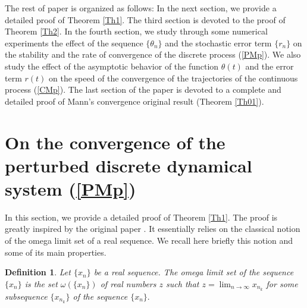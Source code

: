 \documentclass[11pt]{amsart}%
\theoremstyle{plain}
\numberwithin{equation}{section}
\newtheorem{definition}{Definition}[section]
\begin{document}
 The rest of paper is organized as follows: In the next section, we provide a detailed proof of Theorem \ref{Th1}. The third section is devoted to the proof of Theorem \ref{Th2}. In the fourth section, we study through  some numerical experiments  the effect of the sequence $\{\theta_n\}$ and the stochastic error term $\{r_n\}$ on the stability and the rate of convergence of the discrete process (\ref{PMp}). We also study the effect of the asymptotic behavior of the function $\theta(t)$ and the error term $r(t)$ on the speed of the convergence of the trajectories of the continuous process (\ref{CMp}). The last section of the paper is devoted to a complete and detailed proof of Mann's convergence original result (Theorem \ref{Th01}).

\section{On the convergence of the perturbed discrete dynamical system (\ref{PMp})}
In this section, we provide a detailed proof of Theorem \ref{Th1}. The proof is greatly inspired by the original  paper \cite{FM}. It essentially relies on the
classical notion of the omega limit set of a real sequence. We recall here
briefly this notion and some of its main properties.

\begin{definition}
Let $\{x_{n}\}$ be a real sequence. The omega limit set of the sequence $%
\{x_{n}\}$ is the set $\omega (\{x_{n}\})$ of real numbers $z$ such
that $z=\lim_{n\rightarrow \infty }x_{n_{k}}$ for some subsequence $%
\{x_{n_{k}}\}$ of the sequence $\{x_{n}\}.$
\end{definition}
\end{document}
